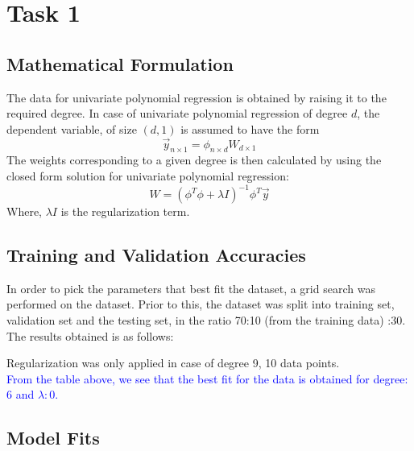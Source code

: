 \documentclass[12pt,a4paper]{article}
\newcommand{\noi}{\noindent}
\begin{document}
\section{Task 1}
\subsection{Mathematical Formulation}
The data for univariate polynomial regression is obtained by raising it to the required degree. In case of univariate polynomial regression of degree $d$, the dependent variable, of size $(d,1)$ is assumed to have the form
\begin{equation}
    \vec{y}_{n\times1} = \mathit{\phi}_{n\times d}W_{d\times1}
\end{equation}
\noi
The weights corresponding to a given degree is then calculated by using the closed form solution for univariate polynomial regression:
\begin{equation}
    W = (\mathit{\phi}^T\mathit{\phi} + \lambda \mathit{I})^{-1}\mathit{\phi}^T\vec{y}
\end{equation}
Where, $\lambda\mathit{I}$ is the regularization term.

\subsection{Training and Validation Accuracies}
In order to pick the parameters that best fit the dataset, a grid search was performed on the dataset. Prior to this, the dataset was split into training set, validation set and the testing set, in the ratio 70:10 (from the training data) :30. The results obtained is as follows:\\

\begin{minipage}{0.4\textwidth}

\end{minipage}\hfill%
\begin{minipage}{0.4\textwidth}

\end{minipage}%

\vspace{1em}
\noi
Regularization was only applied in case of degree 9, 10 data points.\\

\noi
\textcolor{blue}{From the table above, we see that the best fit for the data is obtained for degree: $6$ and $\lambda:0$.}

\subsection{Model Fits}
\end{document}
